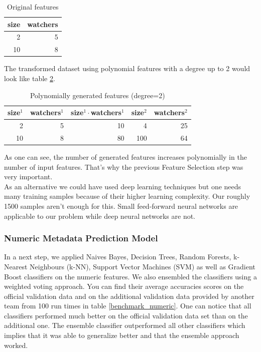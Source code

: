\documentclass[%
a4paper,
DIV12,
2.5headlines,
bigheadings,
titlepage,
openbib,
]{scrartcl}
\begin{document}
\begin{table}[h]
\label{example-feature-engineering-basic}
\centering
\caption{Original features}
\begin{tabular}{|r|r|}
\hline
size & watchers \\ \hline
2    & 5        \\ \hline
10   & 8        \\ \hline
\end{tabular}
\end{table}

The transformed dataset using polynomial features with a degree up to 2 would look like table \ref{example-feature-engineering-transformed}.

\begin{table}[h]
\label{example-feature-engineering-transformed}
\centering
\caption{Polynomially generated features (degree=2)}
\begin{tabular}{|r|r|r|r|r|}
\hline
size$^1$ & watchers$^1$ & size$^1\cdot$watchers$^1$ & size$^2$ & watchers$^2$ \\ \hline
2 & 5 & 10 & 4 & 25 \\ \hline
10 & 8 & 80 & 100 & 64 \\ \hline
\end{tabular}
\end{table}
As one can see, the number of generated features increases polynomially in the number of input features.
That's why the previous Feature Selection step was very important.\\
As an alternative we could have used deep learning techniques but one needs many training samples because of their higher learning complexity.
Our roughly 1500 samples aren't enough for this.
Small feed-forward neural networks are applicable to our problem while deep neural networks are not.

\subsubsection{Numeric Metadata Prediction
Model}\label{numeric-metadata-prediction-model}
In a next step, we applied Naives Bayes, Decision Trees, Random Forests, k-Nearest Neighbours (k-NN), Support Vector Machines (SVM) as well as Gradient Boost classifiers on the numeric features.
We also ensembled the classifiers using a weighted voting approach.
You can find their average accuracies scores on the official validation data and on the additional validation data provided by another team from 100 run times in table \ref{benchmark_numeric}.
One can notice that all classifiers performed much better on the official validation data set than on the additional one.
The ensemble classifier outperformed all other classifiers which implies that it was able to generalize better and that the ensemble approach worked.
\end{document}
